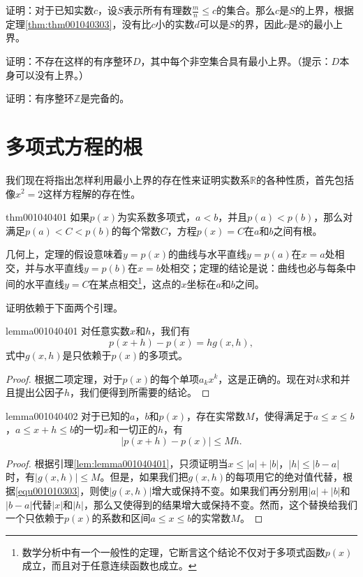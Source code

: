 证明：对于已知实数$c$，设$S$表示所有有理数$\frac{m}{n} \le c$的集合。那么$c$是$S$的上界，根据定理\ref{thm:thm001040303}，没有比$c$小的实数$d$可以是$S$的界，因此$c$是$S$的最小上界。

\begin{exercise}
证明：不存在这样的有序整环$D$，其中每个非空集合具有最小上界。（提示：$D$本身可以没有上界。）
\end{exercise}

\begin{exercise}
证明：有序整环$\mathbb{Z}$是完备的。
\end{exercise}

\section{多项式方程的根}\label{subsection0010404}
我们现在将指出怎样利用最小上界的存在性来证明实数系$\mathbb{R}$的各种性质，首先包括像$x^2=2$这样方程解的存在性。
\begin{theorem}{}{thm001040401}
如果$p(x)$为实系数多项式，$a<b$，并且$p(a)<p(b)$，那么对满足$p(a)<C<p(b)$的每个常数$C$，方程$p(x)=C$在$a$和$b$之间有根。
\end{theorem}

几何上，定理的假设意味着$y=p(x)$的曲线与水平直线$y=p(a)$在$x=a$处相交，并与水平直线$y=p(b)$在$x=b$处相交；定理的结论是说：曲线也必与每条中间的水平直线$y=C$在某点相交\footnote{数学分析中有一个一般性的定理，它断言这个结论不仅对于多项式函数$p(x)$成立，而且对于任意连续函数也成立。}，这点的$x$坐标在$a$和$b$之间。

证明依赖于下面两个引理。

\begin{lemma}{}{lemma001040401}
对任意实数$x$和$h$，我们有
\[
p(x+h) - p(x) = hg(x, h),
\]
式中$g(x, h)$是只依赖于$p(x)$的多项式。
\end{lemma}

\begin{proof}
根据二项定理，对于$p(x)$的每个单项$a_kx^k$，这是正确的。现在对$k$求和并且提出公因子$h$，我们便得到所需要的结论。
\end{proof}

\begin{lemma}{}{lemma001040402}
对于已知的$a$，$b$和$p(x)$，存在实常数$M$，使得满足于$a \le x \le b$，$a \le x+h \le b$的一切$x$和一切正的$h$，有
\[
|p(x+h) - p(x)| \le Mh.
\]
\end{lemma}

\begin{proof}
根据引理\ref{lem:lemma001040401}，只须证明当$x \le |a| + |b|$，$|h| \le |b-a|$时，有$|g(x, h)| \le M$。但是，如果我们把$g(x, h)$的每项用它的绝对值代替，根据\ref{equ001010303}，则使$|g(x, h)|$增大或保持不变。如果我们再分别用$|a| + |b|$和$|b-a|$代替$|x|$和$|h|$，那么又使得到的结果增大或保持不变。然而，这个替换给我们一个只依赖于$p(x)$的系数和区间$a \le x \le b$的实常数$M$。
\end{proof}

